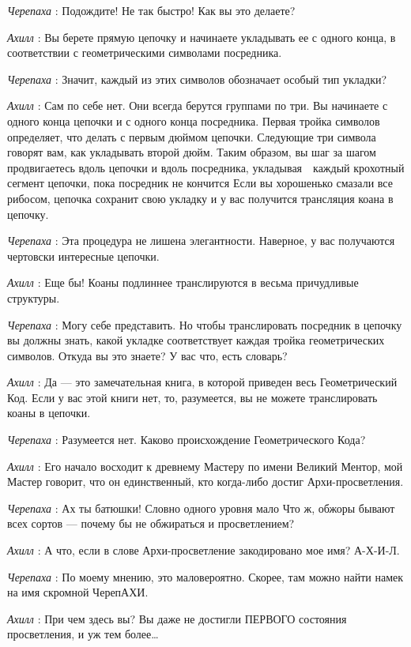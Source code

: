 \emph{Черепаха} : Подождите! Не так быстро! Как вы это делаете?

\emph{Ахилл} : Вы берете прямую цепочку и начинаете укладывать ее с одного конца, в соответствии с геометрическими символами посредника.

\emph{Черепаха} : Значит, каждый из этих символов обозначает особый тип укладки?

\emph{Ахилл} : Сам по себе нет. Они всегда берутся группами по три. Вы начинаете с одного конца цепочки и с одного конца посредника. Первая тройка символов определяет, что делать с первым дюймом цепочки. Следующие три символа говорят вам, как укладывать второй дюйм. Таким образом, вы шаг за шагом продвигаетесь вдоль цепочки и вдоль посредника, укладывая~~каждый крохотный сегмент цепочки, пока посредник не кончится Если вы хорошенько смазали все рибосом, цепочка сохранит свою укладку и у вас получится трансляция коана в цепочку.

\emph{Черепаха} : Эта процедура не лишена элегантности. Наверное, у вас получаются чертовски интересные цепочки.

\emph{Ахилл} : Еще бы! Коаны подлиннее транслируются в весьма причудливые структуры.

\emph{Черепаха} : Могу себе представить. Но чтобы транслировать посредник в цепочку вы должны знать, какой укладке соответствует каждая тройка геометрических символов. Откуда вы это знаете? У вас что, есть словарь?

\emph{Ахилл} : Да --- это замечательная книга, в которой приведен весь Геометрический Код. Если у вас этой книги нет, то, разумеется, вы не можете транслировать коаны в цепочки.

\emph{Черепаха} : Разумеется нет. Каково происхождение Геометрического Кода?

\emph{Ахилл} : Его начало восходит к древнему Мастеру по имени Великий Ментор, мой Мастер говорит, что он единственный, кто когда-либо достиг Архи-просветления.

\emph{Черепаха} : Ах ты батюшки! Словно одного уровня мало Что ж, обжоры бывают всех сортов --- почему бы не обжираться и просветлением?

\emph{Ахилл} : А что, если в слове Архи-просветление закодировано мое имя? А-Х-И-Л.

\emph{Черепаха} : По моему мнению, это маловероятно. Скорее, там можно найти намек на имя скромной ЧерепАХИ.

\emph{Ахилл} : При чем здесь вы? Вы даже не достигли ПЕРВОГО состояния просветления, и уж тем более\ldots{}


